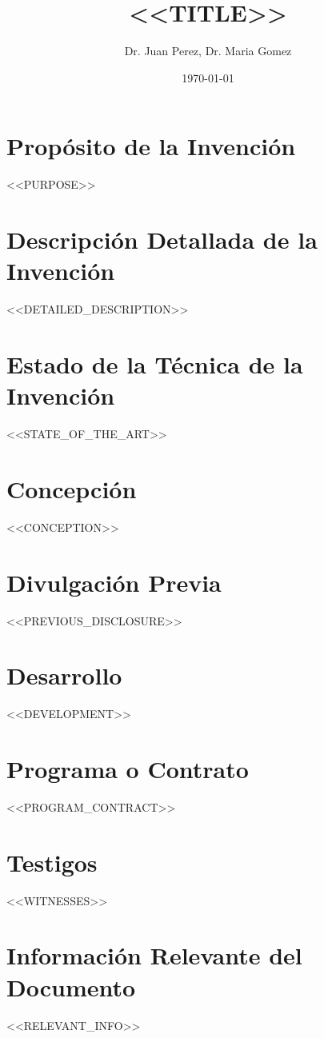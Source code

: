 \documentclass{article}
\title{<<TITLE>>}
\author{Dr. Juan Perez, Dr. Maria Gomez}
\date{\today}
\begin{document}
\maketitle

\section*{Propósito de la Invención}
<<PURPOSE>>

\section*{Descripción Detallada de la Invención}
<<DETAILED_DESCRIPTION>>

\section*{Estado de la Técnica de la Invención}
<<STATE_OF_THE_ART>>

\section*{Concepción}
<<CONCEPTION>>

\section*{Divulgación Previa}
<<PREVIOUS_DISCLOSURE>>

\section*{Desarrollo}
<<DEVELOPMENT>>

\section*{Programa o Contrato}
<<PROGRAM_CONTRACT>>

\section*{Testigos}
<<WITNESSES>>

\section*{Información Relevante del Documento}
<<RELEVANT_INFO>>
\end{document}
